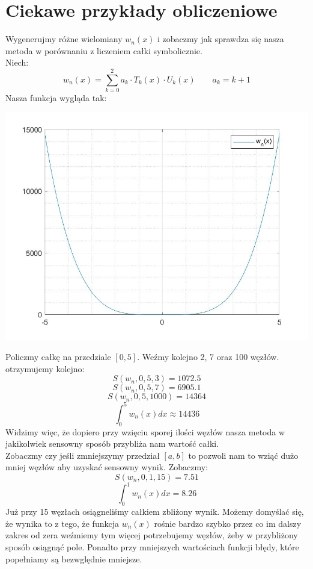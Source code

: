 \documentclass{article}\usepackage{amsmath,amsfonts,amssymb}
\begin{document}
\section{Ciekawe przykłady obliczeniowe}
Wygenerujmy różne wielomiany $w_{n}(x)$ i zobaczmy jak sprawdza się nasza metoda w porównaniu z liczeniem całki symbolicznie. \\
Niech:
\[ w_{n}(x) = \sum_{k = 0}^{2} a_{k}  \cdot T_{k}(x)  \cdot U_{k}(x) \quad \quad a_{k} = k +1 \] 
\newpage
Nasza funkcja wygląda tak:
\begin{center}
   \includegraphics[scale=0.3]{drugi_rysunek.jpg}
\end{center}
Policzmy całkę na przedziale $[0, 5]$. Weźmy kolejno 2, 7 oraz 100 węzłów.
otrzymujemy kolejno: \\
\[ S(w_{n}, 0, 5, 3) = 1072.5 \] 
\[ S(w_{n}, 0, 5, 7) = 6905.1 \] 
\[ S(w_{n}, 0, 5, 1000) = 14364 \] 
\[ \int_0^5w_n(x)dx \approx 14436 \] 
Widzimy więc, że dopiero przy wzięciu sporej ilości węzłów nasza metoda w jakikolwiek sensowny sposób przybliża nam wartość całki.\\
Zobaczmy czy jeśli zmniejszymy przedział $[a,b]$ to pozwoli nam to wziąć dużo mniej węzłów aby uzyskać sensowny wynik. 
Zobaczmy:
\[ S(w_{n}, 0, 1, 15) = 7.51 \] 
\[ \int_0^1w_n(x)dx = 8.26 \] 
Już przy 15 węzłach osiągneliśmy całkiem zbliżony wynik.
Możemy domyślać się, że wynika to z tego, że funkcja $w_n(x)$ rośnie bardzo szybko przez co im dalszy zakres od zera weźmiemy tym więcej potrzebujemy węzłów, żeby w przybliżony sposób osiągnąć pole. Ponadto przy mniejszych wartościach funkcji błędy, które popełniamy są bezwględnie mniejsze. \\
\end{document}
